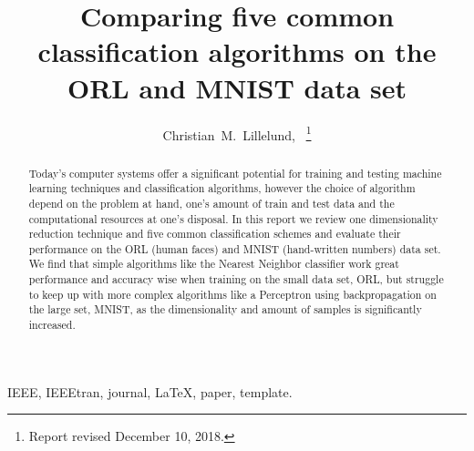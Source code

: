 \documentclass[journal]{IEEEtran}
\begin{document}
	
\title{Comparing five common classification algorithms on the ORL and MNIST data set}


\author{Christian~M.~Lillelund,~
\thanks{Report revised December 10, 2018.}}
\maketitle



\begin{abstract}
Today's computer systems offer a significant potential for training and testing machine learning techniques and classification algorithms, however the choice of algorithm depend on the problem at hand, one's amount of train and test data and the computational resources at one's disposal. In this report we review one dimensionality reduction technique and five common classification schemes and evaluate their performance on the ORL (human faces) and MNIST (hand-written numbers) data set. We find that simple algorithms like the Nearest Neighbor classifier work great performance and accuracy wise when training on the small data set, ORL, but struggle to keep up with more complex algorithms like a Perceptron using backpropagation on the large set, MNIST, as the dimensionality and amount of samples is significantly increased.
\end{abstract}

\begin{IEEEkeywords}
	IEEE, IEEEtran, journal, \LaTeX, paper, template.
\end{IEEEkeywords}
\end{document}
